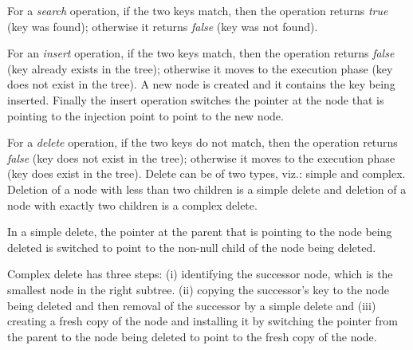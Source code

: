 \documentclass[11pt]{article}
\begin{document}
\begin{multicols}{2}
For a \textit{search} operation, if the two keys match, then the operation returns \textit{true} (key was found); otherwise it returns \textit{false} (key was not found).

For an \textit{insert} operation, if the two keys match, then the operation returns \textit{false} (key already exists in the tree); otherwise it moves to the execution phase (key does not exist in the tree). A new node is created and it contains the key being inserted. Finally the insert operation switches the pointer at the node that is pointing to the injection point to point to the new node.

For a \textit{delete} operation, if the two keys do not match, then the operation returns \textit{false} (key does not exist in the tree); otherwise it moves to the execution phase (key does exist in the tree). Delete can be of two types, viz.: simple and complex. Deletion of a node with less than two children is a simple delete and deletion of a node with exactly two children is a complex delete. 

In a simple delete, the pointer at the parent that is pointing to the node being deleted is switched to point to the non-null child of the node being deleted. 

Complex delete has three steps: (i) identifying the successor node, which is the smallest node in the right subtree. (ii) copying the successor's key to the node being deleted and then removal of the  successor by a simple delete and (iii) creating a fresh copy of the node and installing it by switching the pointer from the parent to the node being deleted to point to the fresh copy of the node.


\end{multicols}
\end{document}
